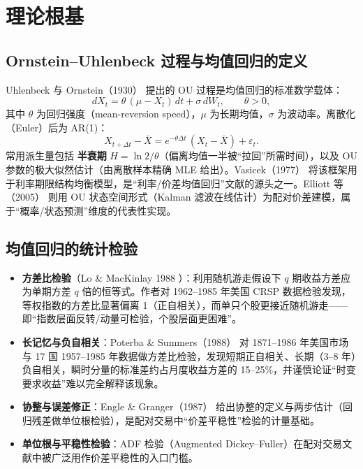 \documentclass[11pt,a4paper]{ctexart}
\begin{document}
\section{理论根基}\label{sec:theory}

\subsection{Ornstein--Uhlenbeck 过程与均值回归的定义}

Uhlenbeck 与 Ornstein（1930）\cite{uhlenbeck1930} 提出的 OU 过程是均值回归的标准数学载体：
\begin{equation}
  dX_t = \theta\,(\mu - X_t)\,dt + \sigma\,dW_t,\qquad \theta>0,
\end{equation}
其中 $\theta$ 为回归强度（mean-reversion speed），$\mu$ 为长期均值，$\sigma$ 为波动率。离散化（Euler）后为 AR(1)：
\begin{equation}
  X_{t+\Delta t} - \bar X = e^{-\theta\Delta t}\,(X_t-\bar X) + \varepsilon_t.
\end{equation}
常用派生量包括 \textbf{半衰期} $H=\ln 2/\theta$（偏离均值一半被“拉回”所需时间），以及 OU 参数的极大似然估计（由离散样本精确 MLE 给出）。Vasicek（1977）\cite{vasicek1977} 将该框架用于利率期限结构均衡模型，是“利率/价差均值回归”文献的源头之一。Elliott 等（2005）\cite{elliott2005} 则用 OU 状态空间形式（Kalman 滤波在线估计）为配对价差建模，属于“概率/状态预测”维度的代表性实现。

\subsection{均值回归的统计检验}

\begin{itemize}
  \item \textbf{方差比检验}（Lo \& MacKinlay 1988 \cite{lomackinlay1988}）：利用随机游走假设下 $q$ 期收益方差应为单期方差 $q$ 倍的恒等式。作者对 1962--1985 年美国 CRSP 数据检验发现，等权指数的方差比显著偏离 1（正自相关），而单只个股更接近随机游走——即“指数层面反转/动量可检验，个股层面更困难”。
  \item \textbf{长记忆与负自相关}：Poterba \& Summers（1988）\cite{poterbasummers1988} 对 1871--1986 年美国市场与 17 国 1957--1985 年数据做方差比检验，发现短期正自相关、长期（3--8 年）负自相关，瞬时分量的标准差约占月度收益方差的 15--25\%，并谨慎论证“时变要求收益”难以完全解释该现象。
  \item \textbf{协整与误差修正}：Engle \& Granger（1987）\cite{englegranger1987} 给出协整的定义与两步估计（回归残差做单位根检验），是配对交易中“价差平稳性”检验的计量基础。
  \item \textbf{单位根与平稳性检验}：ADF 检验（Augmented Dickey--Fuller）在配对交易文献中被广泛用作价差平稳性的入口门槛。
\end{itemize}
\end{document}
